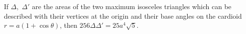 If $\Delta$,~$\Delta'$ are the areas of the two maximum isosceles triangles which
can be described with their vertices at the origin and their base angles on the
cardioid $r = a(1 + \cos\theta)$, then $256\Delta\Delta' = 25a^{4}\sqrt{5}$. 

